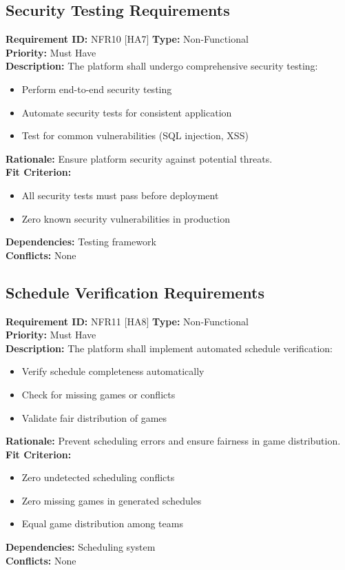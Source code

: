 \documentclass[12pt, titlepage]{article}
\begin{document}
\subsection{Security Testing Requirements}
\textbf{Requirement ID:} NFR10 [HA7] \quad \textbf{Type:} Non-Functional \\
\textbf{Priority:} Must Have \\
\textbf{Description:} The platform shall undergo comprehensive security testing:
\begin{itemize}
    \item Perform end-to-end security testing
    \item Automate security tests for consistent application
    \item Test for common vulnerabilities (SQL injection, XSS)
\end{itemize}
\textbf{Rationale:} Ensure platform security against potential threats.\\
\textbf{Fit Criterion:} 
\begin{itemize}
    \item All security tests must pass before deployment
    \item Zero known security vulnerabilities in production
\end{itemize}
\textbf{Dependencies:} Testing framework\\
\textbf{Conflicts:} None\\

\subsection{Schedule Verification Requirements}
\textbf{Requirement ID:} NFR11 [HA8] \quad \textbf{Type:} Non-Functional \\
\textbf{Priority:} Must Have \\
\textbf{Description:} The platform shall implement automated schedule verification:
\begin{itemize}
    \item Verify schedule completeness automatically
    \item Check for missing games or conflicts
    \item Validate fair distribution of games
\end{itemize}
\textbf{Rationale:} Prevent scheduling errors and ensure fairness in game distribution.\\
\textbf{Fit Criterion:} 
\begin{itemize}
    \item Zero undetected scheduling conflicts
    \item Zero missing games in generated schedules
    \item Equal game distribution among teams
\end{itemize}
\textbf{Dependencies:} Scheduling system\\
\textbf{Conflicts:} None\\
\end{document}

